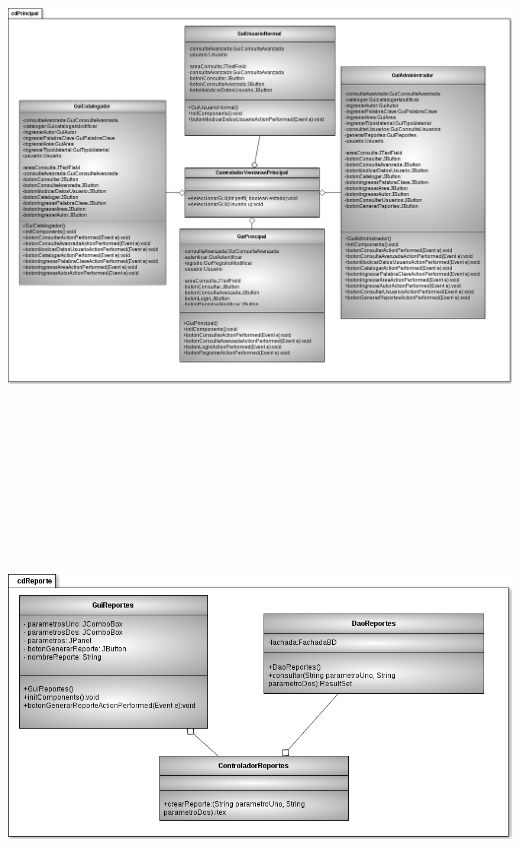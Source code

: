 \documentclass[]{article}
\begin{document}
			\begin{minipage}[c]{1\linewidth}
				\centering
				\includegraphics[width=17cm, height=19cm]{DiagramasClase/PRINCIPAL}
			\end{minipage}
		
			\begin{minipage}[c]{1\linewidth}
				\centering
				\includegraphics[scale=0.5]{DiagramasClase/Reporte}
			\end{minipage} \\[5cm]
		
\end{document}
